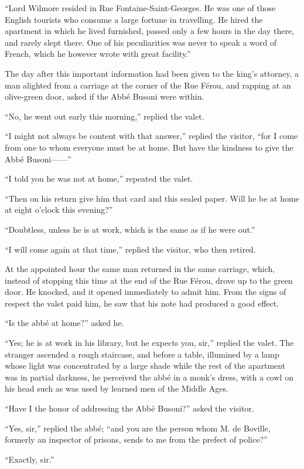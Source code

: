 “Lord Wilmore resided in Rue Fontaine-Saint-Georges. He was one of
those English tourists who consume a large fortune in travelling. He
hired the apartment in which he lived furnished, passed only a few
hours in the day there, and rarely slept there. One of his
peculiarities was never to speak a word of French, which he however
wrote with great facility.”

The day after this important information had been given to the king’s
attorney, a man alighted from a carriage at the corner of the Rue
Férou, and rapping at an olive-green door, asked if the Abbé Busoni
were within.

“No, he went out early this morning,” replied the valet.

“I might not always be content with that answer,” replied the visitor,
“for I come from one to whom everyone must be at home. But have the
kindness to give the Abbé Busoni——”

“I told you he was not at home,” repeated the valet.

“Then on his return give him that card and this sealed paper. Will he
be at home at eight o’clock this evening?”

“Doubtless, unless he is at work, which is the same as if he were out.”

“I will come again at that time,” replied the visitor, who then
retired.

At the appointed hour the same man returned in the same carriage,
which, instead of stopping this time at the end of the Rue Férou, drove
up to the green door. He knocked, and it opened immediately to admit
him. From the signs of respect the valet paid him, he saw that his note
had produced a good effect.

“Is the abbé at home?” asked he.

“Yes; he is at work in his library, but he expects you, sir,” replied
the valet. The stranger ascended a rough staircase, and before a table,
illumined by a lamp whose light was concentrated by a large shade while
the rest of the apartment was in partial darkness, he perceived the
abbé in a monk’s dress, with a cowl on his head such as was used by
learned men of the Middle Ages.

“Have I the honor of addressing the Abbé Busoni?” asked the visitor.

“Yes, sir,” replied the abbé; “and you are the person whom M. de
Boville, formerly an inspector of prisons, sends to me from the prefect
of police?”

“Exactly, sir.”

